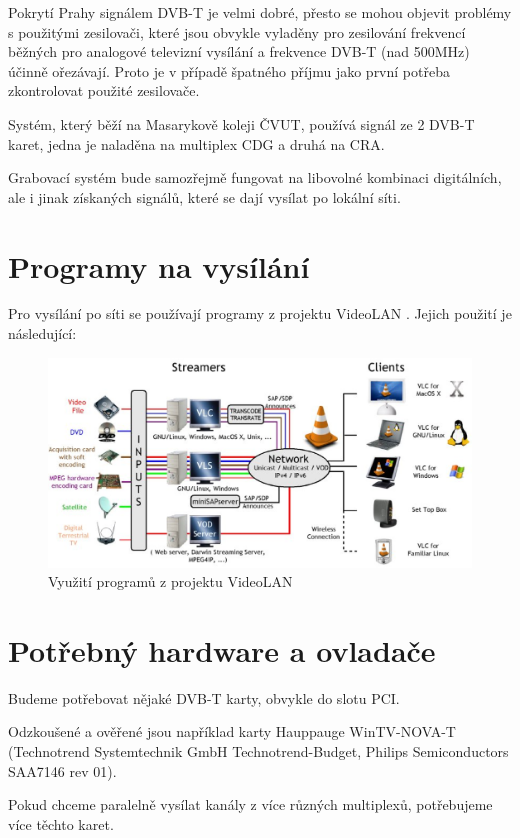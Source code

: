 Pokrytí Prahy signálem DVB-T je velmi dobré, přesto se mohou objevit problémy s použitými zesilovači, které jsou obvykle vyladěny pro zesilování frekvencí běžných pro analogové televizní vysílání a frekvence DVB-T (nad 500MHz) účinně ořezávají. Proto je v případě špatného příjmu jako první potřeba zkontrolovat použité zesilovače.

Systém, který běží na Masarykově koleji ČVUT, používá signál ze 2 DVB-T karet, jedna je naladěna na multiplex CDG a druhá na CRA. 

Grabovací systém bude samozřejmě fungovat na libovolné kombinaci digitálních, ale i jinak získaných signálů, které se dají vysílat po lokální síti.

\section{Programy na vysílání}
Pro vysílání po síti se používají programy z projektu VideoLAN \cite{videolanURL}. Jejich použití je následující:

\begin{figure}[ht]
\begin{center}
\includegraphics[width=15cm]{images/videolan.eps}
\caption{Využití programů z projektu VideoLAN}
\label{fig:videolan}
\end{center}
\end{figure}

\section{Potřebný hardware a ovladače}
Budeme potřebovat nějaké DVB-T karty, obvykle do slotu PCI.

Odzkoušené a ověřené jsou například karty Hauppauge WinTV-NOVA-T (Technotrend Systemtechnik GmbH Technotrend-Budget, Philips Semiconductors SAA7146 rev 01).

Pokud chceme paralelně vysílat kanály z více různých multiplexů, potřebujeme více těchto karet.


